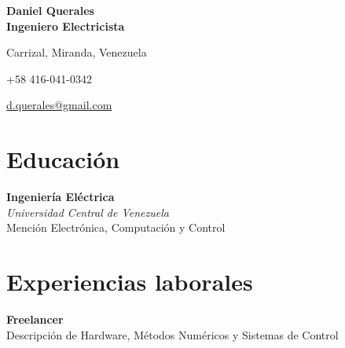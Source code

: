 \documentclass[11pt]{article} %
\begin{document}
{\LARGE\bfseries Daniel Querales} \\ %
{\bfseries Ingeniero Electricista}
\bigskip\bigskip\medskip %

\faLocationArrow  \quad Carrizal, Miranda, Venezuela %

\faPhone \quad +58 416-041-0342 %

\faEnvelopeO \quad \href{mailto:d.querales@gmail.com}{d.querales@gmail.com} %

\faLinkedinSquare  {} %

\faGithub  {} %

\renewcommand{\abstractname}{}    %
\begin{abstract}
I am a Electrical Engineer (especializated in electronics) with two years of experience in FPGA design, synthesis and verification.
\end{abstract}
\bigskip

\section*{Educación}

\textbf{Ingeniería Eléctrica} \\ 
\emph{Universidad Central de Venezuela}\\
Mención Electrónica, Computación y Control

\section*{Experiencias laborales}

\textbf{Freelancer} \\ 
Descripción de Hardware, Métodos Numéricos y Sistemas de Control

\end{document}
